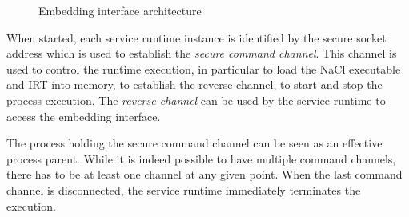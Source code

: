 

\begin{figure}
\centering
\caption{Embedding interface architecture}
\label{fig:architecture}
\end{figure}

When started, each service runtime instance is identified by the
secure socket address which is used to establish the \emph{secure
command channel}. This channel is used to control the runtime execution,
in particular to load the NaCl executable and IRT into memory, to
establish the reverse channel, to start and stop the process execution.
The \emph{reverse channel} can be used by the service runtime to access
the embedding interface.

The process holding the secure command channel can be seen as an
effective process parent. While it is indeed possible to have multiple
command channels, there has to be at least one channel at any given
point.  When the last command channel is disconnected, the service
runtime immediately terminates the execution.



